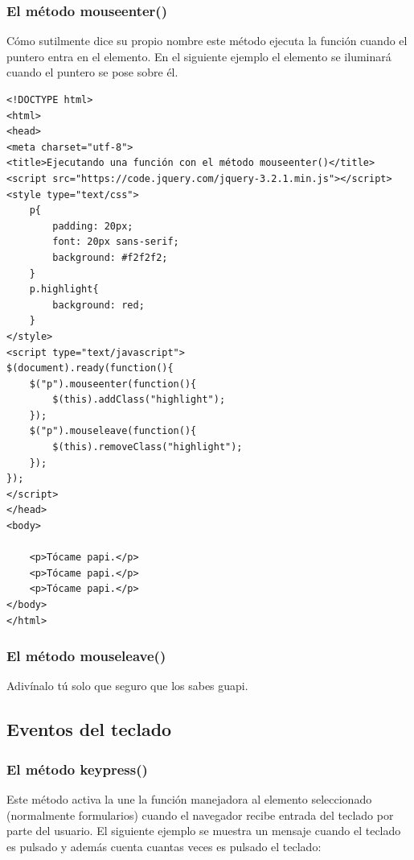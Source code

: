 \documentclass[11pt]{article}
\begin{document}
\subsubsection*{El método mouseenter()}
\label{sec:org58fb42a}

Cómo sutilmente dice su propio nombre este método ejecuta la función cuando el puntero entra en el elemento. En el siguiente ejemplo el elemento se iluminará cuando el puntero se pose sobre él. 

\begin{verbatim}
<!DOCTYPE html>
<html>
<head>
<meta charset="utf-8">
<title>Ejecutando una función con el método mouseenter()</title>
<script src="https://code.jquery.com/jquery-3.2.1.min.js"></script>
<style type="text/css">
    p{
        padding: 20px;
        font: 20px sans-serif;
        background: #f2f2f2;
    }
    p.highlight{
        background: red;
    }
</style>
<script type="text/javascript">
$(document).ready(function(){
    $("p").mouseenter(function(){
        $(this).addClass("highlight");
    });
    $("p").mouseleave(function(){
        $(this).removeClass("highlight");
    });
});
</script>
</head>
<body>

    <p>Tócame papi.</p>
    <p>Tócame papi.</p>
    <p>Tócame papi.</p>
</body>
</html>                                		
\end{verbatim}

\subsubsection*{El método mouseleave()}
\label{sec:orgcb41839}

Adivínalo tú solo que seguro que los sabes guapi.


\subsection*{Eventos del teclado}
\label{sec:orgf23ebc6}

\subsubsection*{El método keypress()}
\label{sec:org920986f}

Este método activa la une la función manejadora al elemento seleccionado (normalmente formularios) cuando el navegador recibe entrada del teclado por parte del usuario. El siguiente ejemplo se muestra un mensaje cuando el teclado es pulsado y además cuenta cuantas veces es pulsado el teclado:
\end{document}
